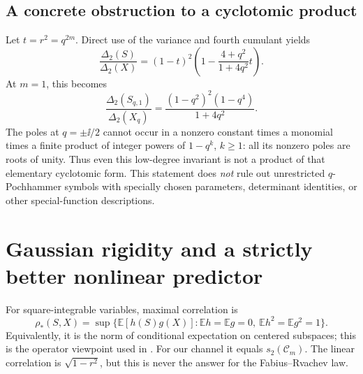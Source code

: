 \documentclass[11pt,a4paper]{article}
\numberwithin{equation}{section}
\theoremstyle{definition}\newtheorem{definition}[theorem]{Definition}
\theoremstyle{remark}\newtheorem{remark}[theorem]{Remark}
\newcommand{\E}{\mathbb E}\newcommand{\Pp}{\mathbb P}
\newcommand{\calC}{\mathcal C_m}\newcommand{\calP}{\mathcal P}
\begin{document}
\subsection{A concrete obstruction to a cyclotomic product}
Let $t=r^2=q^{2m}$. Direct use of the variance and fourth cumulant yields
\begin{equation}
 \frac{\Delta_2(S)}{\Delta_2(X)}
 =(1-t)^2\left(1-\frac{4+q^2}{1+4q^2}t\right).
 \label{eq:degree2det}
\end{equation}
At $m=1$, this becomes
\begin{equation}
 \frac{\Delta_2(S_{q,1})}{\Delta_2(X_q)}
 =\frac{(1-q^2)^2(1-q^4)}{1+4q^2}.
 \label{eq:noncyclotomic}
\end{equation}
The poles at $q=\pm\ii/2$ cannot occur in a nonzero constant times a monomial times a finite product of integer powers of $1-q^k$, $k\ge1$: all its nonzero poles are roots of unity. Thus even this low-degree invariant is not a product of that elementary cyclotomic form. This statement does \emph{not} rule out unrestricted $q$-Pochhammer symbols with specially chosen parameters, determinant identities, or other special-function descriptions.

\section{Gaussian rigidity and a strictly better nonlinear predictor}
\label{sec:rigidity}
For square-integrable variables, maximal correlation is
\begin{equation}
 \rho_*(S,X)=\sup\{\E[h(S)g(X)]:\E h=\E g=0,
 \ \E h^2=\E g^2=1\}.
 \label{eq:rho}
\end{equation}
Equivalently, it is the norm of conditional expectation on centered subspaces; this is the operator viewpoint used in \cite{anantharam}. For our channel it equals $s_2(\calC)$. The linear correlation is $\sqrt{1-r^2}$, but this is never the answer for the Fabius--Rvachev law.
\end{document}
